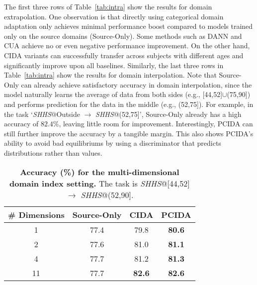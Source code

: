\documentclass{article}
\newcommand{\tabref}[1]{Table~\ref{#1}}
\begin{document}
The first three rows of \tabref{tab:intra} show the results for domain extrapolation. One observation is that directly using categorical domain adaptation only achieves minimal performance boost compared to models trained only on the source domains (Source-Only). Some methods such as DANN and CUA achieve no or even negative performance improvement. On the other hand, CIDA variants can successfully transfer across subjects with different ages and significantly improve upon all baselines. Similarly, the last three rows in \tabref{tab:intra} show the results for domain interpolation. Note that Source-Only can already achieve satisfactory accuracy in domain interpolation, since the model naturally learns the average of data from both sides (e.g., [44,52]$\cup$(75,90]) and performs prediction for the data in the middle (e.g., (52,75]). For example, in the task `\emph{SHHS}$@$Outside $\rightarrow$ \emph{SHHS}@(52,75]', Source-Only already has a high accuracy of $82.4\%$, leaving little room for improvement. Interestingly, PCIDA can still further improve the accuracy by a tangible margin. This also shows PCIDA's ability to avoid bad equilibriums by using a discriminator that predicts distributions rather than values.

\begin{table}[t]
\begin{footnotesize}
\vskip -2mm
\begin{center}
\caption{\textbf{Accuracy (\%) for the multi-dimensional domain index setting.} The task is \emph{SHHS}@[44,52] $\rightarrow$ \emph{SHHS}@(52,90].}
\label{tab:multi}
\vskip 1mm
\begin{tabular}{cccc}
\hline
\# Dimensions  & Source-Only  & CIDA & PCIDA \\
\hline
 1 & 77.4 & 79.8 & \textbf{80.6} \\
 2 & 77.6 & 81.0 & \textbf{81.1} \\
 4 & 77.7 & 81.2 & \textbf{81.3} \\
11 & 77.7 & \textbf{82.6} & \textbf{82.6} \\
\hline
\end{tabular}
\end{center}
\vskip -6mm
\end{footnotesize}
\end{table}
\end{document}
